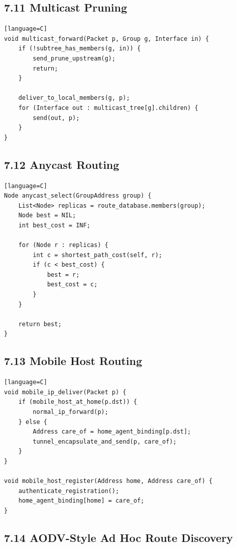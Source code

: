 \documentclass[11pt]{article}
\begin{document}
\subsection{7.11 Multicast Pruning}\label{multicast-pruning}

\begin{verbatim}[language=C]
void multicast_forward(Packet p, Group g, Interface in) {
    if (!subtree_has_members(g, in)) {
        send_prune_upstream(g);
        return;
    }

    deliver_to_local_members(g, p);
    for (Interface out : multicast_tree[g].children) {
        send(out, p);
    }
}
\end{verbatim}

\subsection{7.12 Anycast Routing}\label{anycast-routing}

\begin{verbatim}[language=C]
Node anycast_select(GroupAddress group) {
    List<Node> replicas = route_database.members(group);
    Node best = NIL;
    int best_cost = INF;

    for (Node r : replicas) {
        int c = shortest_path_cost(self, r);
        if (c < best_cost) {
            best = r;
            best_cost = c;
        }
    }

    return best;
}
\end{verbatim}

\subsection{7.13 Mobile Host Routing}\label{mobile-host-routing}

\begin{verbatim}[language=C]
void mobile_ip_deliver(Packet p) {
    if (mobile_host_at_home(p.dst)) {
        normal_ip_forward(p);
    } else {
        Address care_of = home_agent_binding[p.dst];
        tunnel_encapsulate_and_send(p, care_of);
    }
}

void mobile_host_register(Address home, Address care_of) {
    authenticate_registration();
    home_agent_binding[home] = care_of;
}
\end{verbatim}

\subsection{7.14 AODV-Style Ad Hoc Route
Discovery}\label{aodv-style-ad-hoc-route-discovery}
\end{document}
